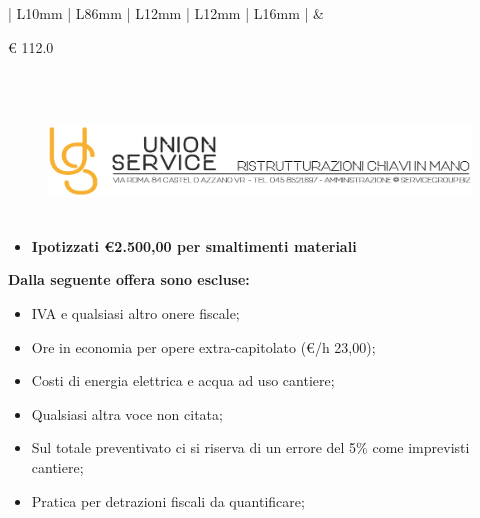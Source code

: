 \documentclass[a4paper]{article}
\begin{document}
                               \noindent\begin{tabular}{| L{10mm} |  L{86mm} | L{12mm} | L{12mm} | L{16mm} | }
                               \hline
                                &
                               \vspace{2.5mm}
                               \begin{spacing}{0}
                                 \euro\hfill
                            112.0
                                           \end{spacing}\\
                                           \hline
                                        
                           \end{tabular}
                           \newpage
                                  \begin{figure}[!t]
                                  \includegraphics[width=15.8cm, height=3cm]{intestazioneAlta2.jpg}
                                  \end{figure}
                               
                          \begin{itemize}
                              \item \textbf{Ipotizzati \euro 2.500,00 per smaltimenti materiali}
                          \end{itemize}

                          \noindent\textbf{Dalla seguente offera sono escluse:}
                          \begin{itemize}
                              \item IVA e qualsiasi altro onere fiscale;
                              \item Ore in economia per opere extra-capitolato (\euro/h 23,00);
                              \item Costi di energia elettrica e acqua ad uso cantiere;
                              \item Qualsiasi altra voce non citata;
                              \item Sul totale preventivato ci si riserva di un errore del 5\% come imprevisti cantiere;
                              \item Pratica per detrazioni fiscali da quantificare;
                          \end{itemize}
\end{document}

